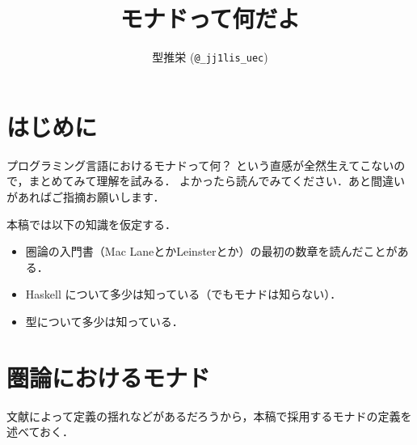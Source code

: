 \documentclass[uplatex,a4paper,dvipdfmx]{jsarticle}
\title{モナドって何だよ}
\author{型推栄 (\texttt{@\_jj1lis\_uec})}
\begin{document}
\maketitle

\section{はじめに}

プログラミング言語におけるモナドって何？ という直感が全然生えてこないので，まとめてみて理解を試みる．
よかったら読んでみてください．あと間違いがあればご指摘お願いします．

本稿では以下の知識を仮定する．
\begin{itemize}
    \item 圏論の入門書（Mac LaneとかLeinsterとか）の最初の数章を読んだことがある．
    \item Haskell について多少は知っている（でもモナドは知らない）．
    \item 型について多少は知っている．
\end{itemize}
    
\section{圏論におけるモナド}
\setcounter{general}{1}

文献によって定義の揺れなどがあるだろうから，本稿で採用するモナドの定義を述べておく．
\end{document}

